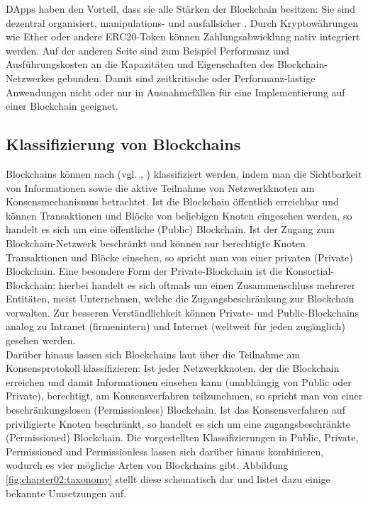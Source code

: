 \acp{DApp} haben den Vorteil, dass sie alle Stärken der Blockchain besitzen: Sie sind dezentral organisiert, manipulations- und ausfallsicher \cite{DAPPS2016}. Durch Kryptowährungen wie Ether oder andere ERC20-Token können Zahlungsabwicklung nativ integriert werden. Auf der anderen Seite sind zum Beispiel Performanz und Ausführungskosten an die Kapazitäten und Eigenschaften des Blockchain-Netzwerkes gebunden. Damit sind zeitkritische oder Performanz-lastige Anwendungen nicht oder nur in Ausnahmefällen für eine Implementierung auf einer Blockchain geeignet.

\subsection{Klassifizierung von Blockchains}
\label{subsec:fundamentals:dlt:classification}
Blockchains können nach \citeauthor{overview2017} (vgl. , \cite{overview2017}) klassifiziert werden, indem man die Sichtbarkeit von Informationen sowie die aktive Teilnahme von Netzwerkknoten am Konsensmechanismus betrachtet. Ist die Blockchain öffentlich erreichbar und können Transaktionen und Blöcke von beliebigen Knoten eingesehen werden, so handelt es sich um eine öffentliche (Public) Blockchain. Ist der Zugang zum Blockchain-Netzwerk beschränkt und können nur berechtigte Knoten Transaktionen und Blöcke einsehen, so spricht man von einer privaten (Private) Blockchain. Eine besondere Form der Private-Blockchain ist die Konsortial-Blockchain; hierbei handelt es sich oftmals um einen Zusammenschluss mehrerer Entitäten, meist Unternehmen, welche die Zugangsbeschränkung zur Blockchain verwalten. Zur besseren Verständlichkeit können Private- und Public-Blockchains analog zu Intranet (firmenintern) und Internet (weltweit für jeden zugänglich) gesehen werden.\\
Darüber hinaus lassen sich Blockchains laut \citeauthor{overview2017} über die Teilnahme am Konsensprotokoll klassifizieren: Ist jeder Netzwerkknoten, der die Blockchain erreichen und damit Informationen einsehen kann (unabhängig von Public oder Private), berechtigt, am Konsensverfahren teilzunehmen, so spricht man von einer beschränkungslosen (Permissionless) Blockchain. Ist das Konsensverfahren auf priviligierte Knoten beschränkt, so handelt es sich um eine zugangsbeschränkte (Permissioned) Blockchain. Die vorgestellten Klassifizierungen in Public, Private, Permissioned und Permissionless lassen sich darüber hinaus kombinieren, wodurch es vier mögliche Arten von Blockchains gibt. Abbildung \ref{fig:chapter02:taxonomy} stellt diese schematisch dar und listet dazu einige bekannte Umsetzungen auf.

